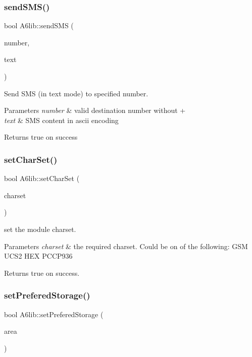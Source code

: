 \subsubsection{\texorpdfstring{send\+S\+M\+S()}{sendSMS()}}
{\footnotesize\ttfamily bool A6lib\+::send\+S\+MS (\begin{DoxyParamCaption}\item[{const String \&}]{number,  }\item[{const String \&}]{text }\end{DoxyParamCaption})}

Send S\+MS (in text mode) to specified number. 
\begin{DoxyParams}{Parameters}
{\em number} & valid destination number without + \\
\hline
{\em text} & S\+MS content in ascii encoding \\
\hline
\end{DoxyParams}
\begin{DoxyReturn}{Returns}
true on success 
\end{DoxyReturn}
\mbox{\label{class_a6lib_abff3a80733dc0964d95ea9b981515f26}} 
\subsubsection{\texorpdfstring{set\+Char\+Set()}{setCharSet()}}
{\footnotesize\ttfamily bool A6lib\+::set\+Char\+Set (\begin{DoxyParamCaption}\item[{const String \&}]{charset }\end{DoxyParamCaption})}

set the module charset. 
\begin{DoxyParams}{Parameters}
{\em charset} & the required charset. Could be on of the following\+: G\+SM U\+C\+S2 H\+EX P\+C\+C\+P936 \\
\hline
\end{DoxyParams}
\begin{DoxyReturn}{Returns}
true on success. 
\end{DoxyReturn}
\mbox{\label{class_a6lib_a8d6a63b19eb9bf6d3edb359b05dbc08e}} 
\subsubsection{\texorpdfstring{set\+Prefered\+Storage()}{setPreferedStorage()}}
{\footnotesize\ttfamily bool A6lib\+::set\+Prefered\+Storage (\begin{DoxyParamCaption}\item[{\mbox{\hyperlink{_a6lib_8h_a683c3425c199702a4b8b13f7f2518af5}{S\+M\+S\+Storage\+Area}}}]{area }\end{DoxyParamCaption})}


